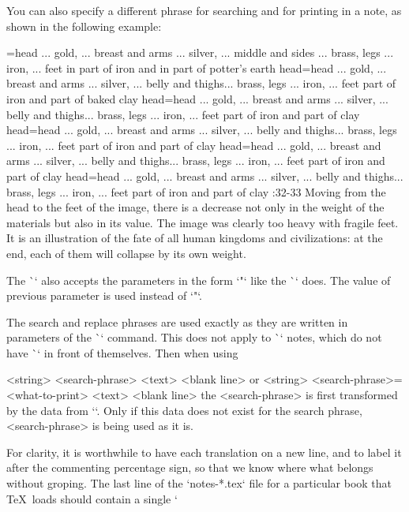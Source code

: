 You can also specify a different phrase
for searching and for printing in a note, as shown in the following example:

\begtt \typosize[8/11]
={head ... gold, ... breast and arms ... silver, ... middle and sides ... brass, legs ... 
        iron, ... feet in part of iron and in part of potter's earth} %
    {head}={head ... gold, ... breast and arms ... silver, ... belly and thighs... brass, legs ... 
        iron, ... feet  part of iron and part of baked clay} %
    {head}={head ... gold, ... breast and arms ... silver, ... belly and thighs... brass, legs ... 
        iron, ... feet  part of iron and part of clay} %
    {head}={head ... gold, ... breast and arms ... silver, ... belly and thighs... brass, legs ... 
        iron, ... feet  part of iron and part of clay} %
    {head}={head ... gold, ... breast and arms ... silver, ... belly and thighs... brass, legs ... 
        iron, ... feet  part of iron and part of clay} %
    {head}={head ... gold, ... breast and arms ... silver, ... belly and thighs... brass, legs ... 
        iron, ... feet  part of iron and part of clay} %
:32-33 {} Moving from the head to the feet of the image, there is a decrease not only in the  
    weight of the materials but also in its value. The image was clearly too heavy with fragile feet.
    It is an illustration of the fate of all human kingdoms and civilizations:  at the end, each 
    of them will collapse by its own weight.
\endtt

The \`\ww` also accepts the parameters in the form `{"}` like the \`\vdef` does. The value of previous parameter is used instead of `{"}`.

The search and replace phrases are used exactly as they are written in
parameters of the \`\ww` command. This does not apply to \`\Note` notes, which do not have
\`\ww` in front of themselves. Then when using

\begtt
\Note <string> {<search-phrase>} <text> <blank line>
\endtt
or
\begtt
\Note <string> {<search-phrase>}={<what-to-print>} <text> <blank line>
\endtt
the <search-phrase> is first transformed by the data from `\vdef`. Only if
this data does not exist for the search phrase, <search-phrase> is being used as it is.

\recommended 
For clarity, it is worthwhile to have each translation on a new line, and to label it after the 
commenting percentage sign, so that we know where what belongs without groping.
The last line of the `notes-*.tex` file for a particular book that \TeX\ loads should contain a 
single `\endinput` command.
Whatever follows below this instruction on subsequent lines will not be seen by \TeX. (But don't 
confuse it with `\end` or `\bye` so that \TeX\ doesn't stop running at this point but continues 
reading
other files.)

